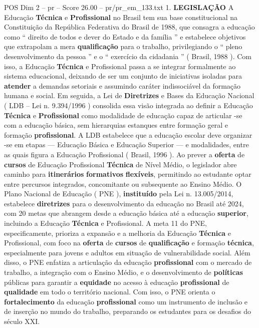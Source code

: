 \begin{textsample}{POS Dim 2 – pr – Score 26.00 – pr/pr\_em\_133.txt}  \label{ex:f2_pos_116}
1. \textbf{LEGISLAÇÃO} A Educação \textbf{Técnica} e \textbf{Profissional} no Brasil tem sua base constitucional na Constituição da República Federativa do Brasil de 1988, que consagra a educação como “ direito de todos e dever do Estado e da família ” e estabelece objetivos que extrapolam a mera \textbf{qualificação} para o trabalho, privilegiando o “ pleno desenvolvimento da pessoa ” e o “ exercício da cidadania ” ( Brasil, 1988 ).
Com isso, a Educação \textbf{Técnica} e Profissional passa a se integrar formalmente ao sistema educacional, deixando de ser um conjunto de iniciativas isoladas para \textbf{atender} a demandas setoriais e assumindo caráter indissociável da formação humana e social.
Em seguida, a Lei de \textbf{Diretrizes} e Bases da Educação Nacional ( LDB – Lei n. 9.394/1996 ) consolida essa visão integrada ao definir a Educação \textbf{Técnica} e \textbf{Profissional} como modalidade de educação capaz de articular -se com a educação básica, sem hierarquias estanques entre formação geral e formação \textbf{profissional}.
A LDB estabelece que a educação escolar deve organizar -se em etapas — Educação Básica e Educação Superior — e modalidades, entre as quais figura a Educação Profissional ( Brasil, 1996 ).
Ao prever a \textbf{oferta} de \textbf{cursos} de Educação Profissional \textbf{Técnica} de Nível Médio, o legislador abre caminho para \textbf{itinerários} \textbf{formativos} \textbf{flexíveis}, permitindo ao estudante optar entre percursos integrados, concomitante ou subsequente ao Ensino Médio.
O Plano Nacional de Educação ( PNE ), \textbf{instituído} pela Lei n. 13.005/2014, estabelece \textbf{diretrizes} para o desenvolvimento da educação no Brasil até 2024, com 20 metas que abrangem desde a educação básica até a educação \textbf{superior}, incluindo a Educação \textbf{Técnica} e Profissional.
A meta 11 do PNE, especificamente, prioriza a expansão e a melhoria da Educação \textbf{Técnica} e Profissional, com foco na \textbf{oferta} de \textbf{cursos} de \textbf{qualificação} e formação \textbf{técnica}, especialmente para jovens e adultos em situação de vulnerabilidade social.
Além disso, o PNE enfatiza a articulação da educação \textbf{profissional} com o mercado de trabalho, a integração com o Ensino Médio, e o desenvolvimento de \textbf{políticas} públicas para garantir a \textbf{equidade} no acesso à educação \textbf{profissional} de \textbf{qualidade} em todo o território nacional.
Com isso, o PNE orienta o \textbf{fortalecimento} da educação \textbf{profissional} como um instrumento de inclusão e de inserção no mundo do trabalho, preparando os estudantes para os desafios do século XXI.

\end{textsample}

